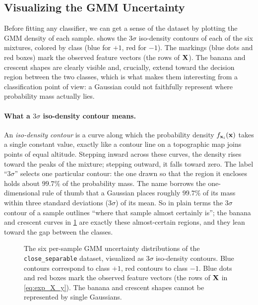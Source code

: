 \documentclass[11pt, letterpaper]{article}
\begin{document}
\subsection{Visualizing the GMM Uncertainty}

Before fitting any classifier, we can get a sense of the dataset by plotting the GMM density of each sample.  shows the $3\sigma$ iso-density contours of each of the six mixtures, colored by class (blue for $+1$, red for $-1$). The markings (blue dots and red boxes) mark the observed feature vectors (the rows of $\vb{X}$). The banana and crescent shapes are clearly visible and, crucially, extend toward the decision region between the two classes, which is what makes them interesting from a classification point of view: a Gaussian could not faithfully represent where probability mass actually lies.

\paragraph{What a $3\sigma$ iso-density contour means.} An \emph{iso-density contour} is a curve along which the probability density $f_{\vb{x}_i}(\vb{x})$ takes a single constant value, exactly like a contour line on a topographic map joins points of equal altitude. Stepping inward across these curves, the density rises toward the peaks of the mixture; stepping outward, it falls toward zero. The label ``$3\sigma$'' selects one particular contour: the one drawn so that the region it encloses holds about $99.7\%$ of the probability mass. The name borrows the one-dimensional rule of thumb that a Gaussian places roughly $99.7\%$ of its mass within three standard deviations ($3\sigma$) of its mean. So in plain terms the $3\sigma$ contour of a sample outlines ``where that sample almost certainly is''; the banana and crescent curves in \cref{fig:exp_dataset_contours} are exactly these almost-certain regions, and they lean toward the gap between the classes.

\begin{figure}
    \centering
    \resizebox{0.75\textwidth}{!}{}
    \caption{The six per-sample GMM uncertainty distributions of the \texttt{close\_separable} dataset, visualized as $3\sigma$ iso-density contours. Blue contours correspond to class $+1$, red contours to class $-1$. Blue dots and red boxes mark the observed feature vectors (the rows of $\vb{X}$ in \cref{eq:exp_X_y}). The banana and crescent shapes cannot be represented by single Gaussians.}
    \label{fig:exp_dataset_contours}
\end{figure}
\end{document}
